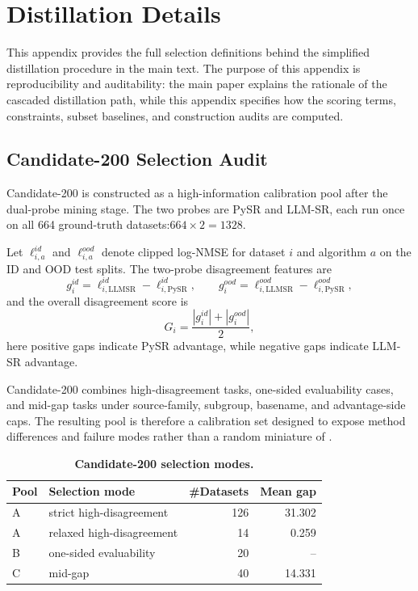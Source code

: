 \section{\core{} Distillation Details}
\label{app:core50-details}

This appendix provides the full selection definitions behind the simplified \core{} distillation procedure in the main text. The purpose of this appendix is reproducibility and auditability: the main paper explains the rationale of the cascaded distillation path, while this appendix specifies how the scoring terms, constraints, subset baselines, and construction audits are computed.

\subsection{Candidate-200 Selection Audit}
\label{app:candidate200-audit}

Candidate-200 is constructed as a high-information calibration pool after the dual-probe mining stage. The two probes are PySR and LLM-SR, each run once on all 664 ground-truth datasets:$664 \times 2 = 1328.$

Let \(\ell_{i,a}^{id}\) and \(\ell_{i,a}^{ood}\) denote clipped log-NMSE for dataset \(i\) and algorithm \(a\) on the ID and OOD test splits. The two-probe disagreement features are
\[
g_i^{id}
=
\ell_{i,\mathrm{LLMSR}}^{id}
-
\ell_{i,\mathrm{PySR}}^{id},
\qquad
g_i^{ood}
=
\ell_{i,\mathrm{LLMSR}}^{ood}
-
\ell_{i,\mathrm{PySR}}^{ood},
\]
and the overall disagreement score is
\[
G_i
=
\frac{
|g_i^{id}|
+
|g_i^{ood}|
}{2},
\]
 here positive gaps indicate PySR advantage, while negative gaps indicate LLM-SR advantage.

Candidate-200 combines high-disagreement tasks, one-sided evaluability cases, and mid-gap tasks under source-family, subgroup, basename, and advantage-side caps. The resulting pool is therefore a calibration set designed to expose method differences and failure modes rather than a random miniature of \reservoir{}.

\begin{table}[ht]
\centering
\small
\caption{\textbf{Candidate-200 selection modes.}}
\label{tab:candidate200-selection-audit}
\begin{tabular}{llrr}
\toprule
\textbf{Pool} & \textbf{Selection mode} & \textbf{\#Datasets} & \textbf{Mean gap} \\
\midrule
A & strict high-disagreement & 126 & 31.302 \\
A & relaxed high-disagreement & 14 & 0.259 \\
B & one-sided evaluability & 20 & -- \\
C & mid-gap & 40 & 14.331 \\
\bottomrule
\end{tabular}
\end{table}

